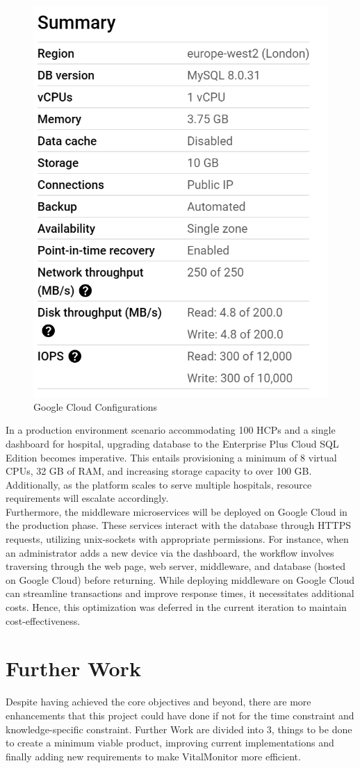 \begin{figure}[h!]
    \centering
    \includegraphics[width=0.5\linewidth]{images/cloud-configurations.png}
    \caption{Google Cloud Configurations}
    \label{fig:cloud-configurations}
\end{figure}

\noindent In a production environment scenario accommodating 100 HCPs and a single dashboard for hospital, upgrading database to the Enterprise Plus Cloud SQL Edition becomes imperative. This entails provisioning a minimum of 8 virtual CPUs, 32 GB of RAM, and increasing storage capacity to over 100 GB. Additionally, as the platform scales to serve multiple hospitals, resource requirements will escalate accordingly.\\

\noindent Furthermore, the middleware microservices will be deployed on Google Cloud in the production phase. These services interact with the database through HTTPS requests, utilizing unix-sockets with appropriate permissions. For instance, when an administrator adds a new device via the dashboard, the workflow involves traversing through the web page, web server, middleware, and database (hosted on Google Cloud) before returning. While deploying middleware on Google Cloud can streamline transactions and improve response times, it necessitates additional costs. Hence, this optimization was deferred in the current iteration to maintain cost-effectiveness.


\section{Further Work}
Despite having achieved the core objectives and beyond, there are more enhancements that this project could have done if not for the time constraint and knowledge-specific constraint. Further Work are divided into 3, things to be done to create a minimum viable product, improving current implementations and finally adding new requirements to make VitalMonitor more efficient.

